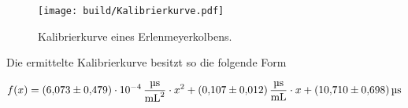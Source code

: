 \begin{figure}[H]
    \centering
    \texttt{[image: build/Kalibrierkurve.pdf]}
    \caption{Kalibrierkurve eines Erlenmeyerkolbens.}
    \label{fig:Kalibrierkurve}
\end{figure}

\noindent Die ermittelte Kalibrierkurve besitzt so die folgende Form

\begin{equation*}
    f(x)= \qty{6.073\pm0.479e-4}{\micro \second \per \milli \liter \squared } \cdot x^2   +  
          \qty{0.107\pm0.012}{\micro \second \per \milli \liter}              \cdot x     +
          \qty{10.71\pm0.698}{\micro \second }
\end{equation*}


%
